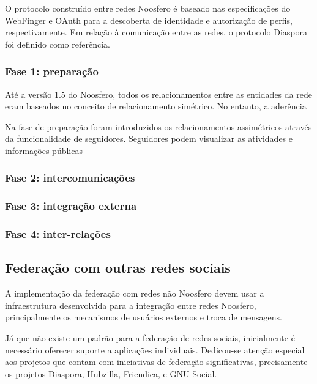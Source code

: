 
O protocolo construído entre redes Noosfero é baseado nas especificações do
WebFinger e OAuth para a descoberta de identidade e autorização de perfis,
respectivamente. Em relação à comunicação entre as redes, o protocolo Diaspora foi
definido como referência. 

\subsubsection{Fase 1: preparação}

Até a versão 1.5 do Noosfero, todos os relacionamentos entre as entidades da rede
eram baseados no conceito de relacionamento simétrico. No entanto, a aderência

Na fase de preparação foram introduzidos os relacionamentos assimétricos através da
funcionalidade de seguidores. Seguidores podem visualizar as atividades e
informações públicas

\subsubsection{Fase 2: intercomunicações}


\subsubsection{Fase 3: integração externa}


\subsubsection{Fase 4: inter-relações}



\subsection{Federação com outras redes sociais}

A implementação da federação com redes não Noosfero devem usar a infraestrutura
desenvolvida para a integração entre redes Noosfero, principalmente os mecanismos
de usuários externos e troca de mensagens.

Já que não existe um padrão para a federação de redes sociais, inicialmente é
necessário oferecer suporte a aplicações individuais. Dedicou-se atenção especial
aos projetos que contam com iniciativas de federação significativas, precisamente
os projetos Diaspora, Hubzilla, Friendica, e GNU Social.

